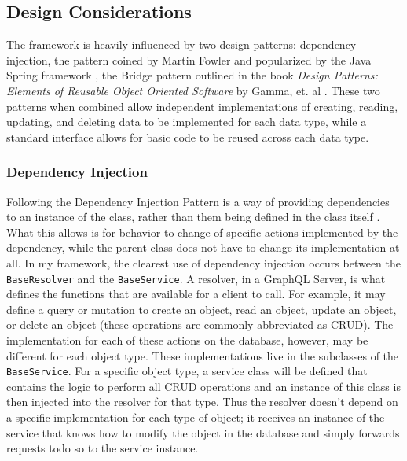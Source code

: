 \subsection{Design Considerations}
The framework is heavily influenced by two design patterns: dependency injection, the pattern coined by Martin Fowler and popularized by the Java Spring framework \cite{fowlerInversionControlContainers2004}, the Bridge pattern outlined in the book \textit{Design Patterns: Elements of Reusable Object Oriented Software} by Gamma, et. al \cite{gammaDesignPatternsElements1995}.  These two patterns when combined allow independent implementations of creating, reading, updating, and deleting data to be implemented for each data type, while a standard interface allows for basic code to be reused across each data type.

\subsubsection{Dependency Injection}
Following the Dependency Injection Pattern is a way of providing dependencies to an instance of the class, rather than them being defined in the class itself \cite{fowlerInversionControlContainers2004}. What this allows is for behavior to change of specific actions implemented by the dependency, while the parent class does not have to change its implementation at all.  In my framework, the clearest use of dependency injection occurs between the \verb!BaseResolver! and the \verb!BaseService!.  A resolver, in a GraphQL Server, is what defines the functions that are available for a client to call.  For example, it may define a query or mutation to create an object, read an object, update an object, or delete an object (these operations are commonly abbreviated as CRUD).  The implementation for each of these actions on the database, however, may be different for each object type.  These implementations live in the subclasses of the \verb!BaseService!.  For a specific object type, a service class will be defined that contains the logic to perform all CRUD operations and an instance of this class is then injected into the resolver for that type.  Thus the resolver doesn't depend on a specific implementation for each type of object; it receives an instance of the service that knows how to modify the object in the database and simply forwards requests todo so to the service instance.

